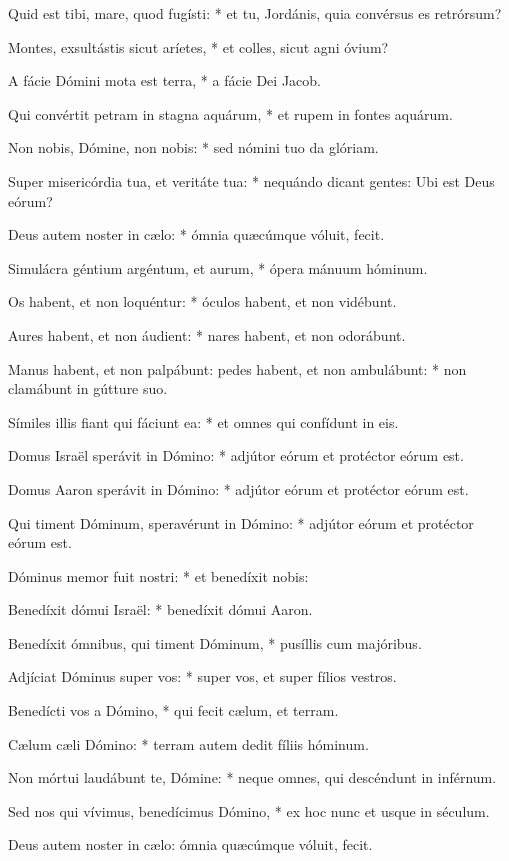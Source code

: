 Quid est tibi, mare, quod fugísti: * et tu, Jordánis, quia convérsus es retrórsum?

Montes, exsultástis sicut aríetes, * et colles, sicut agni óvium?

A fácie Dómini mota est terra, * a fácie Dei Jacob.

Qui convértit petram in stagna aquárum, * et rupem in fontes aquárum.

Non nobis, Dómine, non nobis: * sed nómini tuo da glóriam.

Super misericórdia tua, et veritáte tua: * nequándo dicant gentes: Ubi est Deus eórum?

Deus autem noster in cælo: * ómnia quæcúmque vóluit, fecit.

Simulácra géntium argéntum, et aurum, * ópera mánuum hóminum.

Os habent, et non loquéntur: * óculos habent, et non vidébunt.

Aures habent, et non áudient: * nares habent, et non odorábunt.

Manus habent, et non palpábunt: pedes habent, et non ambulábunt: * non clamábunt in gútture suo.

Símiles illis fiant qui fáciunt ea: * et omnes qui confídunt in eis.

Domus Israël sperávit in Dómino: * adjútor eórum et protéctor eórum est.

Domus Aaron sperávit in Dómino: * adjútor eórum et protéctor eórum est.

Qui timent Dóminum, speravérunt in Dómino: * adjútor eórum et protéctor eórum est.

Dóminus memor fuit nostri: * et benedíxit nobis:

Benedíxit dómui Israël: * benedíxit dómui Aaron.

Benedíxit ómnibus, qui timent Dóminum, * pusíllis cum majóribus.

Adjíciat Dóminus super vos: * super vos, et super fílios vestros.

Benedícti vos a Dómino, * qui fecit cælum, et terram.

Cælum cæli Dómino: * terram autem dedit fíliis hóminum.

Non mórtui laudábunt te, Dómine: * neque omnes, qui descéndunt in inférnum.

Sed nos qui vívimus, benedícimus Dómino, * ex hoc nunc et usque in séculum.


 Deus autem noster in cælo: ómnia quæcúmque vóluit, fecit.

